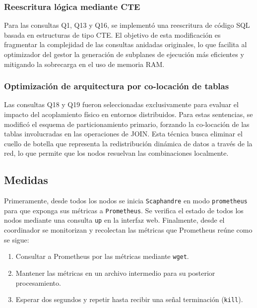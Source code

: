 \documentclass[12pt, letter paper]{report}
\begin{document}
        \subsubsection{Reescritura lógica mediante CTE} %
        \label{ssub:reescritura_lógica_mediante_cte}
          Para las consultas Q1, Q13 y Q16, se implementó una reescritura de
          código SQL basada en estructuras de tipo CTE. El objetivo de esta
          modificación es fragmentar la complejidad de las consultas anidadas
          originales, lo que facilita al optimizador del gestor la generación de
          subplanes de ejecución más eficientes y mitigando la sobrecarga en el
          uso de memoria RAM.

        \subsubsection{Optimización de arquitectura por co-locación de tablas} %
        \label{ssub:optimización_de_arquitectura_por_co_locación_de_tablas}
          Las consultas Q18 y Q19 fueron seleccionadas exclusivamente para
          evaluar el impacto del acoplamiento físico en entornos distribuidos.
          Para estas sentencias, se modificó el esquema de particionamiento
          primario, forzando la co-locación de las tablas involucradas en las
          operaciones de JOIN. Esta técnica busca eliminar el cuello de botella
          que representa la redistribución dinámica de datos a través de la red,
          lo que permite que los nodos resuelvan las combinaciones localmente.

      \subsection{Medidas} %
      \label{sub:medidas}
        Primeramente, desde todos los nodos se inicia \texttt{Scaphandre} en
        modo \texttt{prometheus} para que exponga sus métricas a
        \texttt{Prometheus}. Se verifica el estado de todos los nodos mediante
        una consulta \texttt{up} en la interfaz web. Finalmente, desde el
        coordinador se monitorizan y recolectan las métricas que Prometheus
        reúne como se sigue:

        \begin{enumerate}
          \item Consultar a Prometheus por las métricas mediante \texttt{wget}.
          \item Mantener las métricas en un archivo intermedio para su posterior
          procesamiento.
          \item Esperar dos segundos y repetir hasta recibir una señal
          terminación (\texttt{kill}).
        \end{enumerate}
\end{document}

